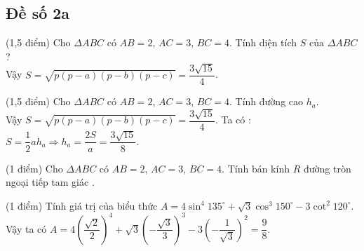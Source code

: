 \subsection{Đề số 2a}
\setcounter{bt}{0}
\begin{bt} (1,5 điểm)
	Cho $\Delta ABC$ có $AB=2$, $AC=3$, $BC=4$. Tính diện tích $S$ của $\Delta ABC$?
	\\
	Vậy $S=\sqrt{p(p-a)(p-b)(p-c)}=\dfrac{3\sqrt{15}}{4}$.
\end{bt}
\begin{bt} (1,5 điểm)
	Cho $\Delta ABC$ có $AB=2$, $AC=3$, $BC=4$. Tính đường cao $h_a$.
	\\
	Vậy $S=\sqrt{p(p-a)(p-b)(p-c)}=\dfrac{3\sqrt{15}}{4}$.
	Ta có : $S=\dfrac{1}{2}a h_a \Rightarrow h_a=\dfrac{2S}{a}=\dfrac{3\sqrt{15}}{8}$.
\end{bt}
\begin{bt} (1 điểm)
	Cho $\Delta ABC$ có $AB=2$, $AC=3$, $BC=4$. Tính bán kính $R$ đường tròn ngoại tiếp tam giác .
\end{bt}
\begin{bt}(1 điểm)
	Tính giá trị của biểu thức $A=4 \sin^4 135^\circ+\sqrt{3}\cos^3 150^\circ-3\cot^2 120^\circ$.
	\\
	Vậy ta có $A=4\left( \dfrac{\sqrt{2}}{2}\right)^4+\sqrt{3}\left(-\dfrac{\sqrt{3}}{3}\right)^3-3\left(-\dfrac{1}{\sqrt{3}}\right)^2=\dfrac{9}{8}$.
\end{bt}

